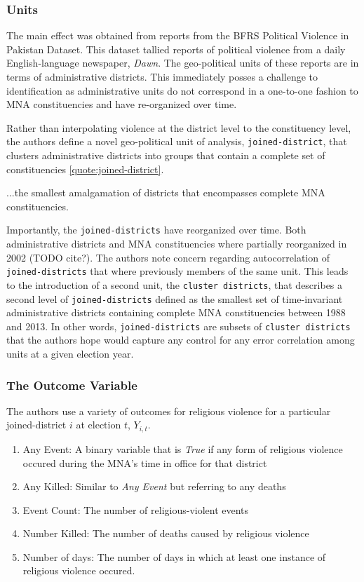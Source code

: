 \documentclass{scrartcl}
\begin{document}
\subsubsection{Units} \label{unit}
The main effect was obtained from reports from the BFRS Political Violence in Pakistan Dataset. This dataset tallied reports of political violence from a daily English-language newspaper, \textit{Dawn}. The geo-political units of these reports are in terms of administrative districts. This immediately posses a challenge to identification as administrative units do not correspond in a one-to-one fashion to MNA constituencies and have re-organized over time.

Rather than interpolating violence at the district level to the constituency level, the authors define a novel geo-political unit of analysis, \texttt{joined-district}, that clusters administrative districts into groups that contain a complete set of constituencies \ref{quote:joined-district}.

\begin{displayquote} \label{quote:joined-district}
  ...the smallest amalgamation of districts that encompasses complete MNA constituencies. 
\end{displayquote}

Importantly, the \texttt{joined-districts} have reorganized over time.
Both administrative districts and MNA constituencies where partially reorganized in 2002 (TODO cite?).
The authors note concern regarding autocorrelation of \texttt{joined-districts} that where previously members of the same unit. 
This leads to the introduction of a second unit, the \texttt{cluster districts}, that describes a second level of \texttt{joined-districts} defined as the smallest set of time-invariant administrative districts containing complete MNA constituencies between 1988 and 2013.
In other words, \texttt{joined-districts} are subsets of \texttt{cluster districts} that the authors hope would capture any control for any error correlation among units at a given election year.


\subsubsection{The Outcome Variable} \label{outcome}

The authors use a variety of outcomes for religious violence for a particular joined-district $i$ at election $t$, $Y_{i,t}$.

\begin{enumerate}
\item Any Event: A binary variable that is \textit{True} if any form of religious violence occured during the MNA's time in office for that district
\item Any Killed: Similar to \textit{Any Event} but referring to any deaths
\item Event Count: The number of religious-violent events
\item Number Killed: The number of deaths caused by religious violence
\item Number of days: The number of days in which at least one instance of religious violence occured.
\end{enumerate}
\end{document}
